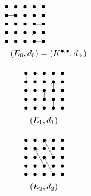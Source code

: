 \documentclass[../main.tex]{subfiles}
\begin{document}
\begin{rem}
\begin{minipage}{0.3\textwidth}
\begin{align*}
&\xymatrix@=0pt{
 \bullet & \bullet & \bullet & \bullet & \bullet \\
 \bullet & \ar@{<-}[]+C;[l]+C\bullet & \bullet &\bullet & \bullet \\
 \bullet & \bullet & \bullet & \bullet &  \ar@{<-}[]+C;[l]+C\bullet \\
 \bullet & \bullet & \bullet & \ar@{<-}[]+C;[l]+C\bullet & \bullet \\
 \bullet & \bullet & \bullet & \bullet & \ar@{<-}[]+C;[l]+C\bullet \\
}\\
&\hspace{10pt}(E_0,d_0)=(K^{\bullet,\bullet},d_>)
\end{align*}
\end{minipage}
\begin{minipage}{0.3\textwidth}
\begin{align*}
&\xymatrix@=0pt{
 \ar@{<-}[]+C;[d]+C\bullet & \bullet & \bullet & \bullet & \bullet \\
 \bullet & \bullet & \bullet & \ar@{<-}[]+C;[d]+C\bullet & \bullet \\
 \bullet & \bullet & \ar@{<-}[]+C;[d]+C\bullet & \bullet & \bullet \\
 \bullet & \bullet & \bullet & \ar@{<-}[]+C;[d]+C\bullet & \bullet \\
 \bullet & \bullet & \bullet & \bullet & \bullet \\
}\\
&\hspace{10pt}(E_1,d_1)
\end{align*}
\end{minipage}
\begin{minipage}{0.3\textwidth}
\begin{align*}
&\xymatrix@=0pt{
 \bullet & \bullet & \ar@{<-}[]+C;[rdd]+C\bullet & \bullet & \bullet \\
 \bullet & \ar@{<-}[]+C;[rdd]+C\bullet & \bullet & \bullet & \bullet \\
 \bullet & \bullet & \ar@{<-}[]+C;[rdd]+C\bullet & \bullet & \bullet \\
 \bullet & \bullet & \bullet & \bullet & \bullet \\
 \bullet & \bullet & \bullet & \bullet & \bullet \\
}\\
&\hspace{10pt}(E_2,d_2)
\end{align*}
\end{minipage}


\end{rem}
\end{document}
